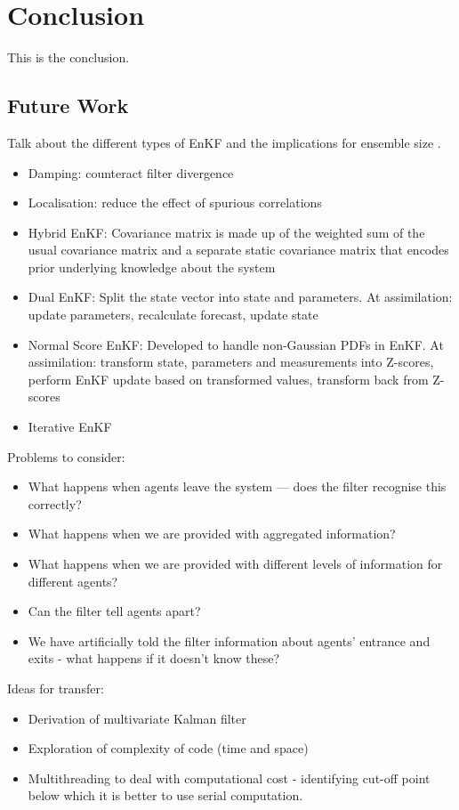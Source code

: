\chapter{Conclusion}\label{ch:conclusion}

This is the conclusion.

\section{Future Work}\label{sec:conc:future}

Talk about the different types of EnKF and the implications for ensemble size
\citep{keller2018comparing}.

\begin{itemize}
    \item Damping: counteract filter divergence
    \item Localisation: reduce the effect of spurious correlations
    \item Hybrid EnKF: Covariance matrix is made up of the weighted sum of the
        usual covariance matrix and a separate static covariance matrix that
        encodes prior underlying knowledge about the system
    \item Dual EnKF: Split the state vector into state and parameters. At
        assimilation: update parameters, recalculate forecast, update state
    \item Normal Score EnKF: Developed to handle non-Gaussian PDFs in EnKF. At
        assimilation: transform state, parameters and measurements into
        Z-scores, perform EnKF update based on transformed values, transform
        back from Z-scores
    \item Iterative EnKF
\end{itemize}

Problems to consider:
\begin{itemize}
    \item What happens when agents leave the system --- does the filter
        recognise this correctly?
    \item What happens when we are provided with aggregated information?
    \item What happens when we are provided with different levels of information
        for different agents?
    \item Can the filter tell agents apart?
    \item We have artificially told the filter information about agents'
        entrance and exits - what happens if it doesn't know these?
\end{itemize}

Ideas for transfer:
\begin{itemize}
    \item Derivation of multivariate Kalman filter
    \item Exploration of complexity of code (time and space)
    \item Multithreading to deal with computational cost - identifying cut-off
        point below which it is better to use serial computation. 
\end{itemize}
